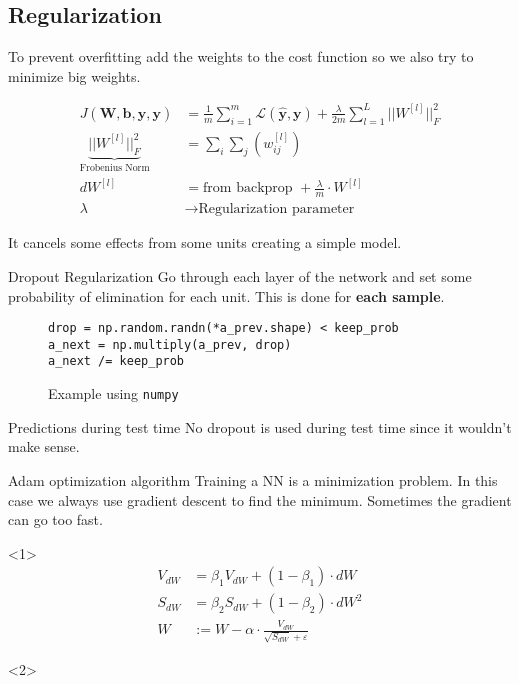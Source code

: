 \subsection{Regularization}
\begin{frame}{\insertsubsec}
    To prevent overfitting add the weights to the cost function so we also try to minimize
    big weights.

    \begin{align*}
        J(\bm{W}, \bm{b}, \hat{\bm{y}}, \bm{y}) &= 
        \frac{1}{m} \sum_{i = 1}^m \mathcal{L}(\hat{\bm{y}}, \bm{y}) + 
        \frac{\lambda}{2m} \sum_{l=1}^L ||W^{[l]}||^2_F \\ 
        \underbrace{||W^{[l]}||^2_F}_{\text{Frobenius Norm}} &= \sum_i \sum_j (w_{ij}^{[l]}) \\ 
        dW^{[l]} &= \text{from backprop } + \frac{\lambda}{m} \cdot W^{[l]} \\
        \lambda &\rightarrow \text{Regularization parameter}
    \end{align*}

    It cancels some effects from some units creating a simple model.
\end{frame}
\begin{frame}[fragile]{Dropout Regularization}
    Go through each layer of the network and set some probability of elimination for each unit. 
    This is done for \textbf{each sample}.

    \begin{figure}
        \begin{verbatim}
drop = np.random.randn(*a_prev.shape) < keep_prob
a_next = np.multiply(a_prev, drop)
a_next /= keep_prob
        \end{verbatim}
        \caption{Example using \texttt{numpy}}
    \end{figure}

    \begin{alertblock}{Predictions during test time}
        No dropout is used during test time since it wouldn't make sense.
    \end{alertblock}
\end{frame}

\begin{frame}{Adam optimization algorithm}
    Training a NN is a minimization problem. In this case we always use gradient descent
    to find the minimum. Sometimes the gradient can go too fast.

    \begin{onlyenv}<1>
        \begin{align*}
            V_{dW} &= \beta_1 V_{dW} + (1 - \beta_1) \cdot dW \\
            S_{dW} &= \beta_2 S_{dW} + (1 - \beta_2) \cdot dW^2 \\
            W &:= W - \alpha \cdot \frac{V_{dW}}{\sqrt{S_{dW}} + \varepsilon}
        \end{align*}
    \end{onlyenv}
    \begin{onlyenv}<2>
        
    \end{onlyenv}
\end{frame}

